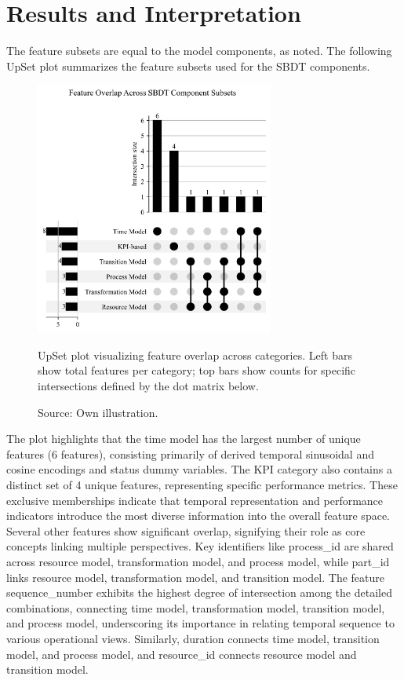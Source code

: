 \section{Results and Interpretation}
The feature subsets are equal to the model components, as noted. The following UpSet plot summarizes the feature subsets used for the SBDT components.

\begin{figure}[htbp]
  \centering
  \includegraphics[width=0.7\textwidth]{figures/upset.png}
  \caption[UpSet plot]{UpSet plot visualizing feature overlap across categories. Left bars show total features per category; top bars show counts for specific intersections defined by the dot matrix below.}
  \caption*{Source: Own illustration.}
  \label{fig:upsetplot}
\end{figure}

The plot highlights that the time model has the largest number of unique features (6 features), consisting primarily of derived temporal sinusoidal and cosine encodings and status dummy variables. The KPI category also contains a distinct set of 4 unique features, representing specific performance metrics. These exclusive memberships indicate that temporal representation and performance indicators introduce the most diverse information into the overall feature space.
Several other features show significant overlap, signifying their role as core concepts linking multiple perspectives. Key identifiers like process\_id are shared across resource model, transformation model, and process model, while part\_id links resource model, transformation model, and transition model. The feature sequence\_number exhibits the highest degree of intersection among the detailed combinations, connecting time model, transformation model, transition model, and process model, underscoring its importance in relating temporal sequence to various operational views. Similarly, duration connects time model, transition model, and process model, and resource\_id connects resource model and transition model.

